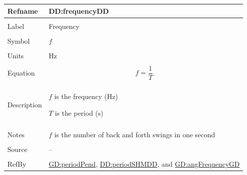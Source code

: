 \documentclass[12pt]{article}
\begin{document}
\vspace{\baselineskip}
\noindent
\begin{minipage}{\textwidth}
\begin{tabular}{>{\raggedright}p{}>{\raggedright\arraybackslash}p{}}
\toprule \textbf{Refname} & \textbf{DD:frequencyDD}
\label{DD:frequencyDD}
\\ \midrule \\
Label & Frequency
        
\\ \midrule \\
Symbol & $f$
         
\\ \midrule \\
Units & ${\text{Hz}}$
        
\\ \midrule \\
Equation & \begin{displaymath}
           f=\frac{1}{T}
           \end{displaymath}
\\ \midrule \\
Description & \begin{symbDescription}
              \item{$f$ is the frequency (${\text{Hz}}$)}
              \item{$T$ is the period (${\text{s}}$)}
              \end{symbDescription}
\\ \midrule \\
Notes & $f$ is the number of back and forth swings in one second
        
\\ \midrule \\
Source & --
         
\\ \midrule \\
RefBy & \hyperref[GD:periodPend]{GD:periodPend}, \hyperref[DD:periodSHMDD]{DD:periodSHMDD}, and \hyperref[GD:angFrequencyGD]{GD:angFrequencyGD}
        
\\ \bottomrule
\end{tabular}
\end{minipage}
\end{document}
